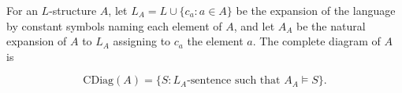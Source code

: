 For an $L$-structure $A$, let $L_A = L \cup \{c_a : a \in A\}$ be the expansion of the language by constant symbols naming each element of $A$, and let $A_A$ be the natural expansion of $A$ to $L_A$ assigning to $c_a$ the element $a$. The complete diagram of $A$ is

$$\text{CDiag}(A) = \{S : L_A\text{-sentence such that } A_A \models S\}.$$
